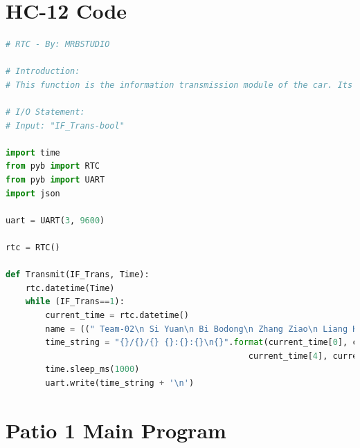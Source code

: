 \documentclass[12pt, a4paper, oneside]{report}
\begin{document}
\section*{HC-12 Code}
\begin{lstlisting}[language=Python]
# RTC - By: MRBSTUDIO

# Introduction:
# This function is the information transmission module of the car. Its purpose is to transmit a time information to the computer without returning any variables

# I/O Statement:
# Input: "IF_Trans-bool"

import time
from pyb import RTC
from pyb import UART
import json

uart = UART(3, 9600)

rtc = RTC()

def Transmit(IF_Trans, Time):
    rtc.datetime(Time)
    while (IF_Trans==1):
        current_time = rtc.datetime()
        name = ((" Team-02\n Si Yuan\n Bi Bodong\n Zhang Ziao\n Liang Hengrui\n Zheng Jiashu\n Li Zhengjie\n Lv Guandong\n Gao Tianji\n Liu Yanyan\n Ruan Haoxi"))
        time_string = "{}/{}/{} {}:{}:{}\n{}".format(current_time[0], current_time[1], current_time[2],
                                                 current_time[4], current_time[5], current_time[6], name)
        time.sleep_ms(1000)
        uart.write(time_string + '\n')
\end{lstlisting}
\newpage\section*{Patio 1 Main Program}
\end{document}
